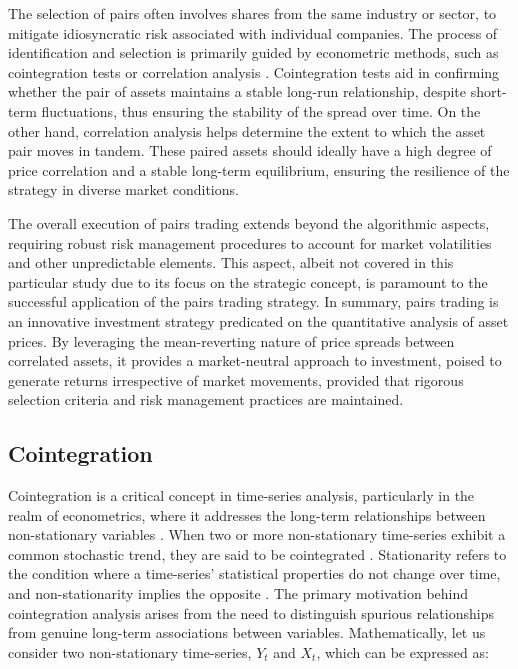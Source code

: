 \documentclass{article}
\theoremstyle{break}
\begin{document}
The selection of pairs often involves shares from the same industry or sector, to mitigate idiosyncratic risk associated with individual companies. The process of identification and selection is primarily guided by econometric methods, such as cointegration tests or correlation analysis \cite{chan_machine_trading, chan_algorithmic_trading, chan_quantitative_trading}. Cointegration tests aid in confirming whether the pair of assets maintains a stable long-run relationship, despite short-term fluctuations, thus ensuring the stability of the spread over time. On the other hand, correlation analysis helps determine the extent to which the asset pair moves in tandem. These paired assets should ideally have a high degree of price correlation and a stable long-term equilibrium, ensuring the resilience of the strategy in diverse market conditions.

The overall execution of pairs trading extends beyond the algorithmic aspects, requiring robust risk management procedures to account for market volatilities and other unpredictable elements. This aspect, albeit not covered in this particular study due to its focus on the strategic concept, is paramount to the successful application of the pairs trading strategy. In summary, pairs trading is an innovative investment strategy predicated on the quantitative analysis of asset prices. By leveraging the mean-reverting nature of price spreads between correlated assets, it provides a market-neutral approach to investment, poised to generate returns irrespective of market movements, provided that rigorous selection criteria and risk management practices are maintained.

\subsection{Cointegration}
Cointegration is a critical concept in time-series analysis, particularly in the realm of econometrics, where it addresses the long-term relationships between non-stationary variables \cite{engle_granger, chan_algorithmic_trading}. When two or more non-stationary time-series exhibit a common stochastic trend, they are said to be cointegrated \cite{engle_granger}. Stationarity refers to the condition where a time-series' statistical properties do not change over time, and non-stationarity implies the opposite \cite{engle_granger}. The primary motivation behind cointegration analysis arises from the need to distinguish spurious relationships from genuine long-term associations between variables. Mathematically, let us consider two non-stationary time-series, $Y_t$ and $X_t$, which can be expressed as:
\end{document}
